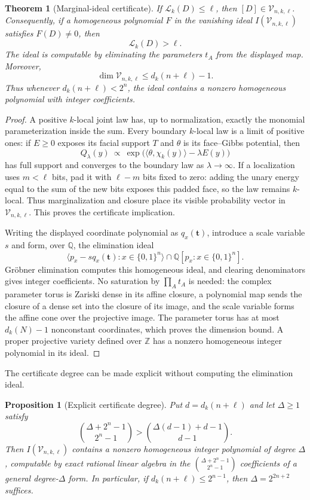\documentclass{article}
\newcommand{\LC}{\mathcal{L}}
\newcommand{\bits}{\{0,1\}}
\newtheorem{theorem}{Theorem}
\newtheorem{proposition}{Proposition}
\begin{document}
\begin{theorem}[Marginal-ideal certificate]
\label{thm:algebraic-certificate}
If $\LC_k(D)\le\ell$, then $[D]\in\mathcal V_{n,k,\ell}$.  Consequently, if a
homogeneous polynomial $F$ in the vanishing ideal
$I(\mathcal V_{n,k,\ell})$ satisfies $F(D)\ne0$, then
\[
  \LC_k(D)>\ell.
\]
The ideal is computable by eliminating the parameters $t_A$ from the displayed
map.  Moreover,
\[
  \dim\mathcal V_{n,k,\ell}\le d_k(n+\ell)-1.
\]
Thus whenever $d_k(n+\ell)<2^n$, the ideal contains a nonzero homogeneous
polynomial with integer coefficients.
\end{theorem}

\begin{proof}
A positive $k$-local joint law has, up to normalization, exactly the monomial
parameterization inside the sum.  Every boundary $k$-local law is a limit of
positive ones: if $E\ge0$ exposes its facial support $T$ and $\theta$ is its
face--Gibbs potential, then
\[
  Q_\lambda(y)\ \propto\
  \exp\!\bigl(\langle\theta,\chi_k(y)\rangle-\lambda E(y)\bigr)
\]
has full support and converges to the boundary law as $\lambda\to\infty$.
If a localization uses $m<\ell$ bits, pad it with
$\ell-m$ bits fixed to zero: adding the unary energy equal to the sum of the
new bits exposes this padded face, so the law remains $k$-local.  Thus
marginalization and closure place its visible probability vector in
$\mathcal V_{n,k,\ell}$.  This proves the certificate implication.

Writing the displayed coordinate polynomial as $q_x(\mathbf t)$, introduce a
scale variable $s$ and form, over $\mathbb Q$, the elimination ideal
\[
  \big\langle p_x-sq_x(\mathbf t):x\in\bits^n\big\rangle
  \cap\mathbb Q[p_x:x\in\bits^n].
\]
Gr\"obner elimination computes this homogeneous ideal, and clearing
denominators gives integer coefficients.  No saturation by
$\prod_A t_A$ is needed: the complex parameter torus is Zariski dense in its
affine closure, a polynomial map sends the closure of a dense set into the
closure of its image, and the scale variable forms the affine cone over the
projective image.  The parameter torus
has at most $d_k(N)-1$ nonconstant coordinates, which proves the dimension
bound.  A proper projective variety defined over $\mathbb Z$ has a nonzero
homogeneous integer polynomial in its ideal.
\end{proof}

The certificate degree can be made explicit without computing the elimination
ideal.

\begin{proposition}[Explicit certificate degree]\label{prop:certificate-degree}
Put $d=d_k(n+\ell)$ and let $\Delta\ge1$ satisfy
\[
  \binom{\Delta+2^n-1}{2^n-1}>\binom{\Delta(d-1)+d-1}{d-1}.
\]
Then $I(\mathcal V_{n,k,\ell})$ contains a nonzero homogeneous integer
polynomial of degree $\Delta$, computable by exact rational linear algebra in
the $\binom{\Delta+2^n-1}{2^n-1}$ coefficients of a general degree-$\Delta$
form.  In particular, if $d_k(n+\ell)\le2^{n-1}$, then $\Delta=2^{2n+2}$
suffices.
\end{proposition}
\end{document}
